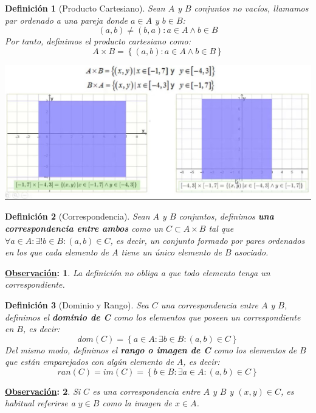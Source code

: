 \documentclass[10pt,a4paper,openright]{book}
\theoremstyle{break}
\newtheorem*{defi}{Definición}
\newtheorem*{obs}{\underline{Observación}:}
\begin{document}
\begin{defi}[Producto Cartesiano]
Sean $A$ y $B$ conjuntos no vacíos, llamamos par ordenado a una pareja donde $a \in A$ y $b \in B$:
$$(a,b)\neq (b,a) : a\in A \wedge b\in B$$
Por tanto, definimos el producto cartesiano como:
$$A\times B=\left\lbrace (a,b) : a \in A \wedge b \in B\right\rbrace$$
\begin{center}
\includegraphics[scale=0.5]{producto cartesiano}
\end{center}
\end{defi}
 
\begin{defi}[Correspondencia]
Sean $A$ y $B$ conjuntos, definimos \textbf{una correspondencia entre ambos} como un $C\subset A \times B$ tal que $\forall a \in A : \exists! b \in B : (a,b)\in C$, es decir, un conjunto formado por pares ordenados en los que cada elemento de $A$ tiene un único elemento de $B$ asociado.
\end{defi}

\begin{obs}
La definición no obliga a que todo elemento tenga un correspondiente.
\end{obs}

\begin{defi}[Dominio y Rango]
Sea $C$ una correspondencia entre $A$ y $B$, definimos el \textbf{dominio de C} como los elementos que poseen un correspondiente en $B$, es decir:
$$dom(C)=\left\lbrace a\in A : \exists b \in B : (a,b)\in C\right\rbrace$$
Del mismo modo,  definimos el \textbf{rango o imagen de C} como los elementos de $B$ que están emparejados con algún elemento de $A$, es decir:
$$ran(C)=im(C)=\left\lbrace b\in B : \exists a \in A : (a,b)\in C\right\rbrace$$
\end{defi}

\begin{obs}
Si $C$ es una correspondencia entre $A$ y $B$ y $(x,y)\in C$, es habitual referirse a $y\in B$ como la imagen de $x \in A$. 
\end{obs}
\end{document}
